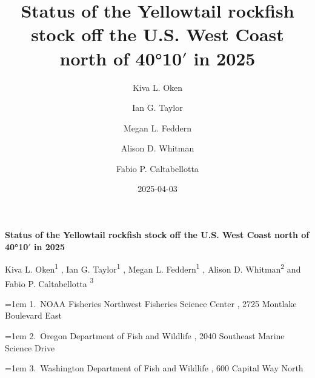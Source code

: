 \documentclass[
]{scrartcl}
\title{Status of the Yellowtail rockfish stock off the U.S. West Coast
north of 40°10\(\prime\) in 2025}
\author{Kiva L. Oken \and Ian G. Taylor \and Megan L.
Feddern \and Alison D. Whitman \and Fabio P. Caltabellotta}
\date{2025-04-03}
\begin{document}
  \begin{titlepage}

  \begin{minipage}[b][\textheight][s]{\textwidth}


  \raggedright




  {\huge\bfseries\nohyphens{Status of the Yellowtail rockfish stock off
  the U.S. West Coast north of 40°10\(\prime\) in
  2025}}\\[1\baselineskip]



  \vspace{1\baselineskip}


  \vspace{1\baselineskip}

   {\large{Kiva L. Oken}}{\textsuperscript{1}}%
  ,
   {\large{Ian G. Taylor}}{\textsuperscript{1}}%
  ,
   {\large{Megan L. Feddern}}{\textsuperscript{1}}%
  ,
   {\large{Alison D. Whitman}}{\textsuperscript{2}}%
  { and \large{Fabio P. Caltabellotta}}%
  {\textsuperscript{3}}%



  \vspace{2\baselineskip}

  \hangindent=1em
  {1}.~{NOAA Fisheries Northwest Fisheries Science Center}%
  , %
  {2725 Montlake Boulevard East}%
  \par\hangindent=1em%
  {2}.~{Oregon Department of Fish and Wildlife}%
  , %
  {2040 Southeast Marine Science Drive}%
  \par\hangindent=1em%
  {3}.~{Washington Department of Fish and Wildlife}%
  , %
  {600 Capital Way North}%



\end{minipage}
\end{titlepage}
\end{document}
